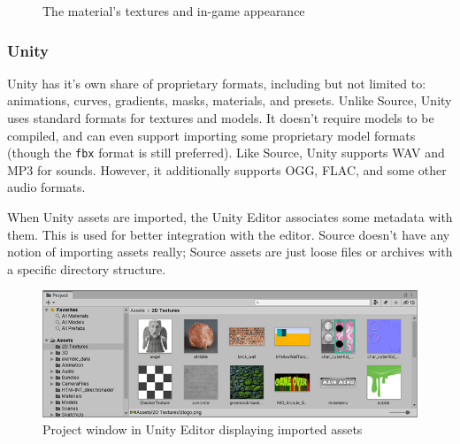 \documentclass[a4paper, 12pt]{scrartcl}
\begin{document}
\begin{figure}[!htb]
  \centering
  \qquad
  \caption{The material's textures and in-game appearance}
  \label{fig:source_texture}
\end{figure}

\subsubsection{Unity}
Unity has it's own share of proprietary formats, including but not limited to: animations, curves, gradients, masks, materials, and presets. Unlike Source, Unity uses standard formats for textures and models. It doesn't require models to be compiled, and can even support importing some proprietary model formats (though the \texttt{fbx} format is still preferred). Like Source, Unity supports WAV and MP3 for sounds. However, it additionally supports OGG, FLAC, and some other audio formats.

When Unity assets are imported, the Unity Editor associates some metadata with them. This is used for better integration with the editor. Source doesn't have any notion of importing assets really; Source assets are just loose files or archives with a specific directory structure.

\begin{figure}[!htb]
  \centering
  \includegraphics[width=0.75\linewidth]{images/unity_project_window.png}
  \caption{Project window in Unity Editor displaying imported assets}
  \label{fig:unity_project_window}
\end{figure}
\end{document}
